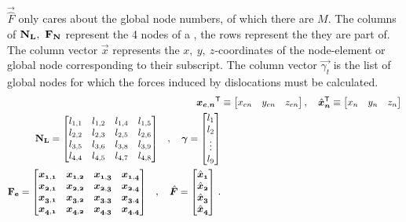 $ \vec{\hat{F}} $ only cares about the global node numbers, of which there are $ M $. The columns of $ \mathbf{N_{L}},~ \mathbf{F_{N}} $ represent the 4 nodes of a , the rows represent the  they are part of. The column vector $ \vec{x} $ represents the $ x,~y,~z$-coordinates of the node-element or global node corresponding to their subscript. The column vector $ \vec{\gamma_{t}} $ is the list of global nodes for which the forces induced by dislocations must be calculated.
\begin{align}
	\vec{x_{e,n}}^{\mathsf{T}} & \equiv	\begin{bmatrix}
		x_{en} & y_{en} & z_{en}
	\end{bmatrix}, \quad
	\vec{\hat{x}_{n}}^{\mathsf{T}} \equiv	\begin{bmatrix}
		x_{n} & y_{n} & z_{n}
	\end{bmatrix}      \\
	\begin{split}
		\mtx{N_{L}} &=	\begin{bmatrix}
			l_{1,1} & l_{1,2} & l_{1,4} & l_{1,5} \\
			l_{2,2} & l_{2,3} & l_{2,5} & l_{2,6} \\
			l_{3,5} & l_{3,6} & l_{3,8} & l_{3,9} \\
			l_{4,4} & l_{4,5} & l_{4,7} & l_{4,8} \\
		\end{bmatrix}
	\end{split}
	, \quad
	\vec{\gamma} =   \begin{bmatrix}
		l_1    \\
		l_2    \\
		\vdots \\
		l_9
	\end{bmatrix}                          \\
	\begin{split}
		\mtx{F_{e}} &=	\begin{bmatrix}
			\vec{x_{1,1}} & \vec{x_{1,2}} & \vec{x_{1,3}} & \vec{x_{1,4}} \\
			\vec{x_{2,1}} & \vec{x_{2,2}} & \vec{x_{2,3}} & \vec{x_{2,4}} \\
			\vec{x_{3,1}} & \vec{x_{3,2}} & \vec{x_{3,3}} & \vec{x_{3,4}} \\
			\vec{x_{4,1}} & \vec{x_{4,2}} & \vec{x_{4,3}} & \vec{x_{4,4}} \\
		\end{bmatrix}
	\end{split}
	,\quad
	\vec{\hat{F}} = 	\begin{bmatrix}
		\vec{\hat{x}_{1}} \\
		\vec{\hat{x}_{2}} \\
		\vec{\hat{x}_{3}} \\
		\vec{\hat{x}_{4}}
	\end{bmatrix}\,.\label{eq:force_imp}
\end{align}

